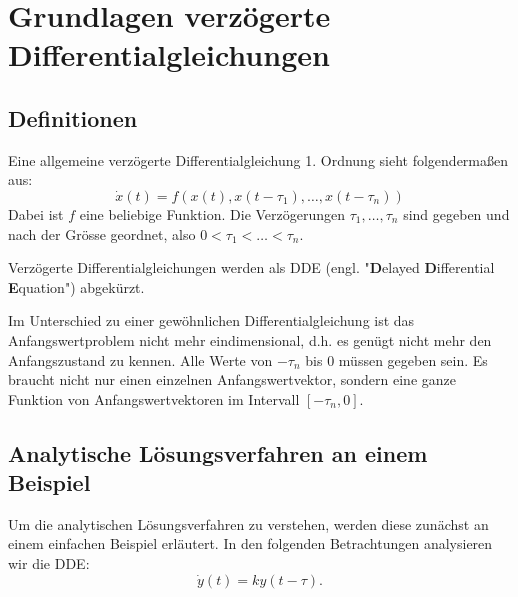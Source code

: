 %
%
%
\section{Grundlagen verzögerte Differentialgleichungen}
\subsection{Definitionen}


\begin{definition}
	Eine allgemeine verzögerte Differentialgleichung 1. Ordnung sieht folgendermaßen aus:
	\begin{equation}
		\dot{x}(t) = f(x(t),x(t-\tau_1),\dots,x(t-\tau_n))
	\end{equation}
	Dabei ist $f$ eine beliebige Funktion. Die Verzögerungen $\tau_1,\dots,\tau_n$ sind gegeben und nach der Grösse geordnet, also $0<\tau_1<\dots<\tau_n$.
\end{definition}
Verzögerte Differentialgleichungen werden als DDE (engl. "\textbf{D}elayed \textbf{D}ifferential \textbf{E}quation") abgekürzt.

Im Unterschied zu einer gewöhnlichen Differentialgleichung ist das Anfangswertproblem nicht mehr eindimensional, d.h. es genügt nicht mehr den Anfangszustand zu kennen.
Alle Werte von $-\tau_n$ bis $0$ müssen gegeben sein. 
Es braucht nicht nur einen einzelnen Anfangswertvektor, sondern eine ganze Funktion von Anfangswertvektoren im Intervall $[-\tau_n, 0]$.

\subsection{Analytische Lösungsverfahren an einem Beispiel}
Um die analytischen Lösungsverfahren zu verstehen, werden diese zunächst an einem einfachen Beispiel erläutert.
In den folgenden Betrachtungen analysieren wir die DDE:
\begin{equation}\label{bsp}
\dot{y}(t)=ky(t-\tau).
\end{equation}

